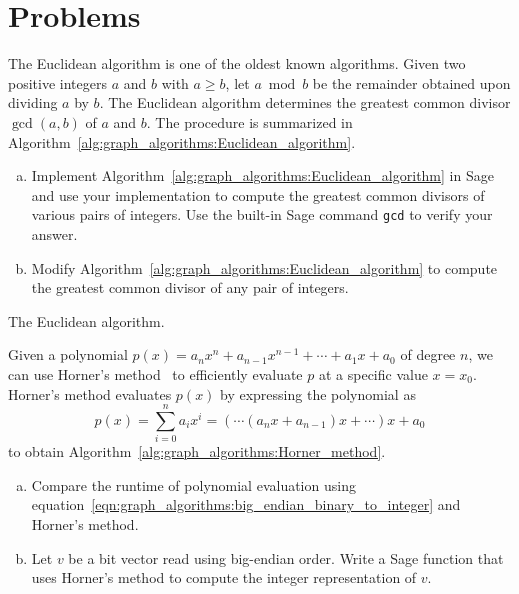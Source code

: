 \section{Problems}

\begin{problem}
\item The Euclidean algorithm is one of the oldest known
  algorithms. Given two positive integers $a$ and $b$ with $a \geq b$,
  let $a \bmod b$ be the remainder obtained upon dividing $a$ by $b$.
  The Euclidean algorithm determines the greatest common divisor
  $\gcd(a,b)$ of $a$ and $b$. The procedure is summarized in
  Algorithm~\ref{alg:graph_algorithms:Euclidean_algorithm}.
  \begin{enumerate}[(a)]
  \item Implement
    Algorithm~\ref{alg:graph_algorithms:Euclidean_algorithm} in Sage
    and use your implementation to compute the greatest common
    divisors of various pairs of integers. Use the built-in Sage
    command \verb!gcd! to verify your answer.

  \item Modify
    Algorithm~\ref{alg:graph_algorithms:Euclidean_algorithm} to
    compute the greatest common divisor of any pair of integers.
  \end{enumerate}

\begin{algorithm}[!htbp]

\caption{The Euclidean algorithm.}
\label{alg:graph_algorithms:Euclidean_algorithm}
\end{algorithm}

\item\label{prob:graph_algorithms:Horner_method} Given a polynomial
  $p(x) = a_n x^n + a_{n-1} x^{n-1} + \cdots + a_1 x + a_0$ of degree
  $n$, we can use Horner's method~\cite{Horner1819} to efficiently
  evaluate $p$ at a specific value $x = x_0$. Horner's method evaluates
  $p(x)$ by expressing the polynomial as
  \[
  p(x)
  =
  \sum_{i=0}^n a_i x^i
  =
  (\cdots (a_n x + a_{n-1}) x + \cdots)x + a_0
  \]
  to obtain Algorithm~\ref{alg:graph_algorithms:Horner_method}.
  \begin{enumerate}[(a)]
  \item Compare the runtime of polynomial evaluation using
    equation~\eqref{eqn:graph_algorithms:big_endian_binary_to_integer}
    and Horner's method.

  \item Let $v$ be a bit vector read using big-endian order. Write a
    Sage function that uses Horner's method to compute the integer
    representation of $v$.


\end{enumerate}
\end{problem}
